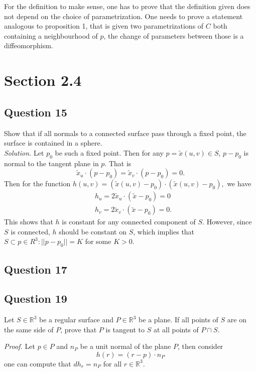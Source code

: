 \documentclass[12pt]{article}
\begin{document}
For the definition to make sense, one has to prove that the definition given does not depend on the choice of parametrization.
One needs to prove a statement analogous to proposition 1, that is given two parametrizations of \(C\) both containing a neighbourhood of \(p\),
the change of parameters between those is a diffeomorphism.

\section{Section 2.4}

\subsection*{Question 15}
Show that if all normals to a connected surface pass through a fixed point, the surface is contained in a sphere.\\

\textit{Solution.} Let $p_0$ be such a fixed point. Then for any $p = \utilde{x}(u,v)\in S$, $p-p_0$ is normal to the tangent plane in $p$. That is \begin{equation*}
    \utilde{x}_u\cdot (p-p_0) = \utilde{x}_v\cdot (p-p_0) = 0.
\end{equation*}
Then for the function $h(u,v)=(\utilde{x}(u,v)-p_0)\cdot(\utilde{x}(u,v)-p_0),$ we have \begin{align*}
    &h_u = 2\utilde{x}_u\cdot (\utilde{x}-p_0) = 0\\
    &h_v = 2\utilde{x}_v\cdot (\utilde{x}-p_0) = 0.
\end{align*}
This shows that $h$ is constant for any connected component of $S$. However, since $S$ is connected, $h$ should be constant on $S$, which implies that $S\subset {p\in R^3:||p-p_0|| = K}$ for some $K>0$.

\subsection*{Question 17}

\subsection*{Question 19}

Let \(S \in \mathbb{R}^3\) be a regular surface and \(P \in \mathbb{R}^3\) be a plane.
If all points of \(S\) are on the same side of \(P\), prove that \(P\) is tangent to \(S\) at all points of \(P \cap S\).

\emph{Proof.}
Let \(p \in P\) and \(n_P\) be a unit normal of the plane \(P\), then consider \[ h(r) = (r - p)\cdot n_P \]
one can compute that \(dh_r = n_P\) for all \(r\in \mathbb{R}^3\).
\end{document}
